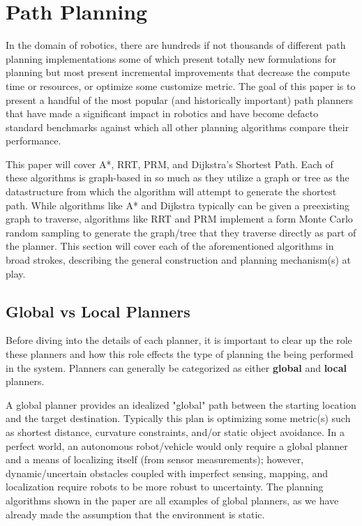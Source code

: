 \section{Path Planning}

In the domain of robotics, there are hundreds if not thousands of different path planning implementations some of which present totally new formulations for planning but most present incremental improvements that decrease the compute time or resources, or optimize some customize metric. The goal of this paper is to present a handful of the most popular (and historically important) path planners that have made a significant impact in robotics and have become defacto standard benchmarks against which all other planning algorithms compare their performance. 

This paper will cover A*, RRT, PRM, and Dijkstra's Shortest Path. Each of these algorithms is graph-based in so much as they utilize a graph or tree as the datastructure from which the algorithm will attempt to generate the shortest path. While algorithms like A* and Dijkstra typically can be given a preexisting graph to traverse, algorithms like RRT and PRM implement a form Monte Carlo random sampling to generate the graph/tree that they traverse directly as part of the planner.  This section will cover each of the aforementioned algorithms in broad strokes, describing the general construction and planning mechanism(s) at play.

\subsection{Global vs Local Planners}

Before diving into the details of each planner, it is important to clear up the role these planners and how this role effects the type of planning the being performed in the system. Planners can generally be categorized as either \textbf{global} and \textbf{local} planners.  

A global planner provides an idealized "global" path between the starting location and the target destination. Typically this plan is optimizing some metric(s) such as shortest distance, curvature constraints, and/or static object avoidance. In a perfect world, an autonomous robot/vehicle would only require a global planner and a means of localizing itself (from sensor measurements); however, dynamic/uncertain obstacles coupled with imperfect sensing, mapping, and localization require robots to be more robust to uncertainty. The planning algorithms shown in the paper are all examples of global planners, as we have already made the assumption that the environment is static. 

